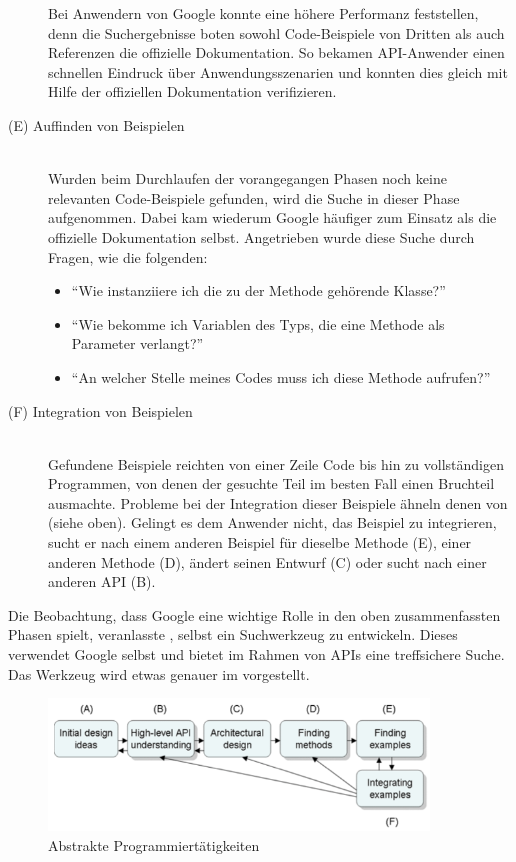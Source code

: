 \begin{important}
\begin{description}
  Bei Anwendern von Google konnte \cite{Stylos:2009ts} eine höhere Performanz feststellen, denn die Suchergebnisse boten sowohl Code-Beispiele von Dritten als auch Referenzen die offizielle Dokumentation. So bekamen API-Anwender einen schnellen Eindruck über Anwendungsszenarien und konnten dies gleich mit Hilfe der offiziellen Dokumentation verifizieren.
    
  \item[(E) Auffinden von Beispielen] \hfill \\
  Wurden beim Durchlaufen der vorangegangen Phasen noch keine relevanten Code-Beispiele gefunden, wird die Suche in dieser Phase aufgenommen. Dabei kam wiederum Google häufiger zum Einsatz als die offizielle Dokumentation selbst. Angetrieben wurde diese Suche durch Fragen, wie die folgenden:
  \begin{itemize} 
  \item ``Wie instanziiere ich die zu der Methode gehörende Klasse?''
  \item ``Wie bekomme ich Variablen des Typs, die eine Methode als Parameter verlangt?''
  \item ``An welcher Stelle meines Codes muss ich diese Methode aufrufen?''
  \end{itemize}
  
  \item[(F) Integration von Beispielen] \hfill \\
  Gefundene Beispiele reichten von einer Zeile Code bis hin zu vollständigen Programmen, von denen der gesuchte Teil im besten Fall einen Bruchteil ausmachte. Probleme bei der Integration dieser Beispiele ähneln denen von \cite{Fairbanks:2006jw} (siehe oben). Gelingt es dem Anwender nicht, das Beispiel zu integrieren, sucht er nach einem anderen Beispiel für dieselbe Methode (E), einer anderen Methode (D), ändert seinen Entwurf (C) oder sucht nach einer anderen API (B).
\end{description}

Die Beobachtung, dass Google eine wichtige Rolle in den oben zusammenfassten Phasen spielt, veranlasste \cite{Stylos:2006gu}, selbst ein Suchwerkzeug zu entwickeln. Dieses verwendet Google selbst und bietet im Rahmen von APIs eine treffsichere Suche. Das Werkzeug wird etwas genauer im  vorgestellt.
\end{important}

\begin{figure}
  \centering
    \includegraphics[width=0.9\textwidth]{Figures/high-level-programming-activities.png}
  \caption{Abstrakte Programmiertätigkeiten \citep{Stylos:2009ts}}
  \label{fig:high-level-programming-activities}
\end{figure}



